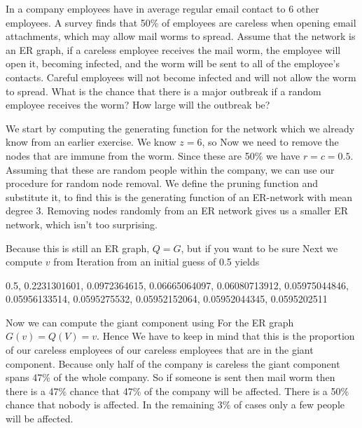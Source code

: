 
\label{exAttackWorm}In a company employees have in average regular email contact to 6 other employees. A survey finds that 50\% of employees are careless when opening email attachments, which may allow mail worms to spread. Assume that the network is an ER graph, if a careless employee receives the mail worm, the employee will open it, becoming infected, and the worm will be sent to all of the employee's contacts. Careful employees will not become infected and will not allow the worm to spread. What is the chance that there is a major outbreak if a random employee receives the worm? How large will the outbreak be? 

\solution
We start by computing the generating function for the network 
which we already know from an earlier exercise. We know $z=6$, so 
Now we need to remove the nodes that are immune from the worm. Since these are 50\% we have $r=c=0.5$. Assuming that these are random people within the company, we can use our procedure for random node removal. We define the pruning function 
and substitute it, to find 
this is the generating function of an ER-network with mean degree 3. Removing nodes randomly from an ER network gives us a smaller ER network, which isn't too surprising.

Because this is still an ER graph, $Q=G$, but if you want to be sure 
Next we compute $v$ from 
Iteration from an initial guess of 0.5 yields 
\begin{center}
0.5, 0.2231301601, 0.0972364615, 0.06665064097, 0.06080713912, 0.05975044846, 0.05956133514, 0.0595275532, 0.05952152064, 0.05952044345, 0.0595202511    
\end{center}

Now we can compute the giant component using 
For the ER graph $G(v)=Q(V)=v$. Hence 
We have to keep in mind that this is the proportion of our careless employees of our careless employees that are in the giant component. Because only half of the company is careless the giant component spans 47\% of the whole company. So if someone is sent then mail worm then there is a 47\% chance that 47\% of the company will be affected. There is a 50\% chance that nobody is affected. In the remaining 3\% of cases only a few people will be affected.  